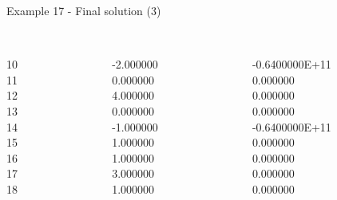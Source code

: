 \begin{frame}{Example 17 - Final solution (3)}
\footnotesize
\begin{columns}[t]
\begin{column}{0.3\textwidth}
\\
10\\
11\\
12\\
13\\
14\\
15\\
16\\
17\\
18\\

\end{column}
\begin{column}{0.3\textwidth}
\\
-2.000000\\
0.000000\\
4.000000\\
0.000000\\
-1.000000\\
1.000000\\
1.000000\\
3.000000\\
1.000000\\

\end{column}

\begin{column}{0.3\textwidth}
\\
-0.6400000E+11\\
0.000000\\
0.000000\\
0.000000\\
-0.6400000E+11\\
0.000000\\
0.000000\\
0.000000\\
0.000000\\

\end{column}
\end{columns}
\end{frame}
